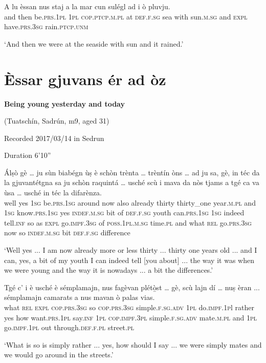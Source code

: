 \begin{linenumbers}
	\gll  A lu èssan nus staj a la mar cun sulégl ad i ò pluvju.   \\
	and then be.\textsc{prs.1pl} \textsc{1pl} \textsc{cop.ptcp.m.pl} at \textsc{def.f.sg} sea with sun.\textsc{m.sg} and \textsc{expl} have.\textsc{prs.3sg} rain.\textsc{ptcp.unm}\\
\end{linenumbers}
\medskip
\glt `And then we were at the seaside with sun and it rained.'
\medskip


\section{Èssar gjuvans ér ad òz}

\noindent
\textbf{Being young yesterday and today}

\noindent
(Tuatschín, Sadrún, m9, aged 31)

\noindent
Recorded 2017/03/14 in Sedrun

\noindent
Duration 6'10''

\bigskip

\begin{linenumbers}
	\gll Álṣò gè … ju sùn biabégn ùṣ è schòn trènta … trèntín òns … ad ju sa, gè, in téc da la gjuvantétgna sa ju schòn raquintá … usché scù i mava da nòs tjams a tgé ca va ùsa … usché in téc la difarènza.\\
	well yes {} \textsc{1sg} be.\textsc{prs.1sg} around now also already thirty {} thirty\_one year.\textsc{m.pl} {} and \textsc{1sg} know.\textsc{prs.1sg} yes \textsc{indef.m.sg} bit of \textsc{def.f.sg} youth can.\textsc{prs.1sg} \textsc{1sg} indeed tell.\textsc{inf} {} so as \textsc{expl} go.\textsc{impf.3sg} of \textsc{poss.1pl.m.sg} time.\textsc{pl} and what \textsc{rel} go.\textsc{prs.3sg} now {} so \textsc{indef.m.sg} bit \textsc{def.f.sg} difference\\
\end{linenumbers}
\medskip
\glt `Well yes ... I am now already more or less thirty ... thirty one years old ... and I can, yes, a bit of my youth I can indeed tell [you about] ... the way it was when we were young and the way it is nowadays ... a bit the differences.'
\medskip

\begin{linenumbers}
	\gll Tgé c’ i è usché è sémplamajn, nus fagèvan plétò̱st … gè, scù lajn dí … nuṣ èran ... sémplamajn camarats a nus mavan ò palas vias.    \\
	what \textsc{rel} \textsc{expl} \textsc{cop.prs.3sg} so \textsc{cop.prs.3sg} simple.\textsc{f.sg.adv} \textsc{1pl} do.\textsc{impf.1p}l rather {} yes how want.\textsc{prs.1pl} say.\textsc{inf} {} \textsc{1pl} \textsc{cop.impf.3pl} {} simple.\textsc{f.sg.adv} mate.\textsc{m.pl} and \textsc{1pl} go.\textsc{impf.1pl} out through.\textsc{def.f.pl} street.\textsc{pl}\\
\end{linenumbers}
\medskip
\glt `What is so is simply rather ... yes, how should I say ... we were simply mates and we would go around in the streets.'
\medskip

